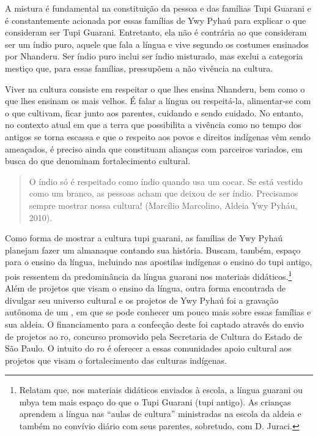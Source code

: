 A mistura é fundamental na constituição da pessoa e das famílias Tupi
Guarani e é constantemente acionada por essas famílias de Ywy Pyhaú
para explicar o que consideram ser Tupi Guarani. Entretanto, ela não é
contrária ao que consideram ser um índio puro, aquele que fala a língua
e vive segundo os costumes ensinados por Nhanderu. Ser índio puro
inclui ser índio misturado, mas exclui a categoria mestiço que, para
essas famílias, pressupõem a não vivência na cultura.

Viver na cultura consiste em respeitar o que lhes ensina Nhanderu, bem
como o que lhes ensinam os mais velhos. É falar a língua ou
respeitá-la, alimentar-se com o que cultivam, ficar junto aos parentes,
cuidando e sendo cuidado. No entanto, no contexto atual em que a terra
que possibilita a vivência como no tempo dos antigos se torna escassa e
que o respeito aos povos e direitos indígenas vêm sendo ameaçados, é
preciso ainda que constituam alianças com parceiros variados, em busca
do que denominam fortalecimento cultural.  

\begin{quotation}
O índio só é respeitado como índio quando usa um cocar. Se está vestido
como um branco, as pessoas acham que deixou de ser índio. Precisamos
sempre mostrar nossa cultura! (Marcílio Marcolino, Aldeia Ywy Pyháu,
2010).
\end{quotation}

Como forma de mostrar a cultura tupi guarani, as famílias de Ywy Pyhaú
planejam fazer um almanaque contando sua história. Buscam, também,
espaço para o ensino da língua, incluindo nas apostilas indígenas o
ensino do tupi antigo, pois ressentem da predominância da língua
guarani nos materiais didáticos.\footnote{Relatam que, nos materiais
didáticos enviados à escola, a língua guarani ou mbya tem mais espaço
do que o Tupi Guarani (tupi antigo). As crianças aprendem a língua nas
``aulas de cultura'' ministradas na escola da aldeia e também no convívio
diário com seus parentes, sobretudo, com D. Juraci.} Além de projetos
que visam o ensino da língua, outra forma encontrada de divulgar seu
universo cultural e os projetos de Ywy Pyhaú foi a gravação autônoma de
um , em que se pode conhecer um pouco mais sobre essas famílias e
sua aldeia. O financiamento para a confecção deste  foi captado
através do envio de projetos ao ro, concurso promovido pela
Secretaria de Cultura do Estado de São Paulo. O intuito do ro é
oferecer a essas comunidades apoio cultural aos projetos que visam o
fortalecimento das culturas indígenas. 

